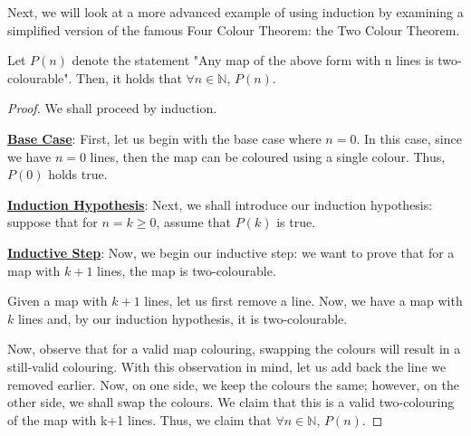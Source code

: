 \documentclass[openany]{book}
\begin{document}
Next, we will look at a more advanced example of using induction by examining a simplified version of the famous Four Colour Theorem: the Two Colour Theorem.
\begin{center}
\end{center}
\begin{theorem}
	Let $P(n)$ denote the statement "Any map of the above form with n lines is two-colourable". Then, it holds that $\forall n \in\mathbb{N}$, $P(n)$.
\end{theorem}
\begin{proof}
	We shall proceed by induction.
	
	\textbf{\underline{Base Case}}: First, let us begin with the base case where $n=0$. In this case, since we have $n=0$ lines, then the map can be coloured using a single colour. Thus, $P(0)$ holds true.
	
	\textbf{\underline{Induction Hypothesis}}: Next, we shall introduce our induction hypothesis: suppose that for $n=k\geq0$, assume that $P(k)$ is true.
	
	\textbf{\underline{Inductive Step}}: Now, we begin our inductive step: we want to prove that for a map with $k+1$ lines, the map is two-colourable.
	
	Given a map with $k+1$ lines, let us first remove a line. Now, we have a map with $k$ lines and, by our induction hypothesis, it is two-colourable. 
	
	Now, observe that for a valid map colouring, swapping the colours will result in a still-valid colouring. With this observation in mind, let us add back the line we removed earlier. Now, on one side, we keep the colours the same; however, on the other side, we shall swap the colours. We claim that this is a valid two-colouring of the map with k+1 lines. Thus, we claim that $\forall n \in \mathbb{N}$, $P(n)$.
\end{proof}
\end{document}

